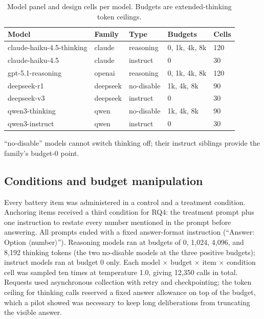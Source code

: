 \documentclass[conference]{IEEEtran}
\begin{document}
\begin{table}[t]
\centering
\caption{Model panel and design cells per model. Budgets are extended-thinking token ceilings.}
\label{tab:design}
\footnotesize
\setlength{\tabcolsep}{3.5pt}
\begin{tabular}{lllll}
\hline
Model & Family & Type & Budgets & Cells \\
\hline
claude-haiku-4.5-thinking & claude & reasoning & 0, 1k, 4k, 8k & 120 \\
claude-haiku-4.5 & claude & instruct & 0 & 30 \\
gpt-5.1-reasoning & openai & reasoning & 0, 1k, 4k, 8k & 120 \\
deepseek-r1 & deepseek & no-disable & 1k, 4k, 8k & 90 \\
deepseek-v3 & deepseek & instruct & 0 & 30 \\
qwen3-thinking & qwen & no-disable & 1k, 4k, 8k & 90 \\
qwen3-instruct & qwen & instruct & 0 & 30 \\
\hline
\end{tabular}
\par\smallskip\footnotesize ``no-disable'' models cannot switch thinking off; their instruct siblings provide the family's budget-0 point.
\end{table}

\subsection{Conditions and budget manipulation}
Every battery item was administered in a control and a treatment condition. Anchoring items received a third condition for RQ4: the treatment prompt plus one instruction to restate every number mentioned in the prompt before answering. All prompts ended with a fixed answer-format instruction (``Answer: Option $\langle$number$\rangle$''). Reasoning models ran at budgets of 0, 1,024, 4,096, and 8,192 thinking tokens (the two no-disable models at the three positive budgets); instruct models ran at budget 0 only. Each model $\times$ budget $\times$ item $\times$ condition cell was sampled ten times at temperature 1.0, giving 12,350 calls in total. Requests used asynchronous collection with retry and checkpointing; the token ceiling for thinking calls reserved a fixed answer allowance on top of the budget, which a pilot showed was necessary to keep long deliberations from truncating the visible answer.
\end{document}
